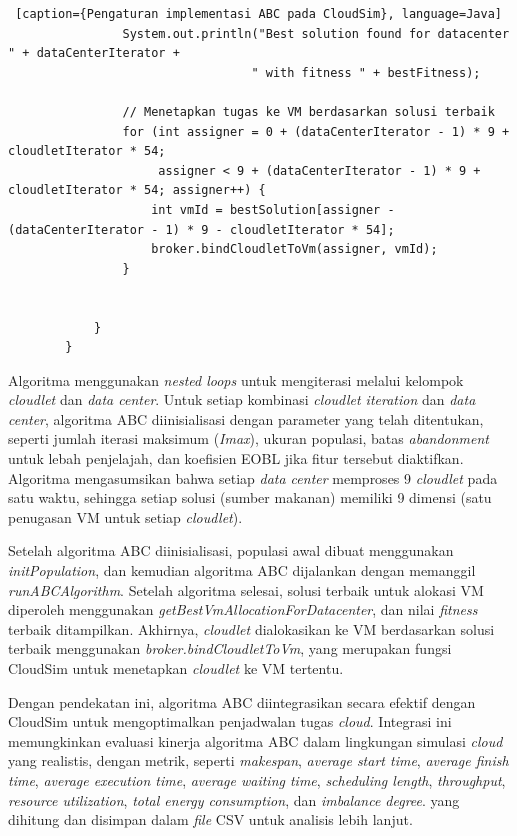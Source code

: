 \begin{lstlisting} [caption={Pengaturan implementasi ABC pada CloudSim}, language=Java]
                System.out.println("Best solution found for datacenter " + dataCenterIterator + 
                                  " with fitness " + bestFitness);

                // Menetapkan tugas ke VM berdasarkan solusi terbaik
                for (int assigner = 0 + (dataCenterIterator - 1) * 9 + cloudletIterator * 54;
                     assigner < 9 + (dataCenterIterator - 1) * 9 + cloudletIterator * 54; assigner++) {
                    int vmId = bestSolution[assigner - (dataCenterIterator - 1) * 9 - cloudletIterator * 54];
                    broker.bindCloudletToVm(assigner, vmId);
                }
                

            }
        }
\end{lstlisting}

Algoritma menggunakan \textit{nested loops} untuk mengiterasi melalui kelompok \textit{cloudlet} dan \textit{data center}. Untuk setiap kombinasi \textit{cloudlet iteration} dan \textit{data center}, algoritma ABC diinisialisasi dengan parameter yang telah ditentukan, seperti jumlah iterasi maksimum (\textit{Imax}), ukuran populasi, batas \textit{abandonment} untuk lebah penjelajah, dan koefisien EOBL jika fitur tersebut diaktifkan. Algoritma mengasumsikan bahwa setiap \textit{data center} memproses 9 \textit{cloudlet} pada satu waktu, sehingga setiap solusi (sumber makanan) memiliki 9 dimensi (satu penugasan VM untuk setiap \textit{cloudlet}).

Setelah algoritma ABC diinisialisasi, populasi awal dibuat menggunakan \textit{initPopulation}, dan kemudian algoritma ABC dijalankan dengan memanggil \textit{runABCAlgorithm}. Setelah algoritma selesai, solusi terbaik untuk alokasi VM diperoleh menggunakan \textit{getBestVmAllocationForDatacenter}, dan nilai \textit{fitness} terbaik ditampilkan. Akhirnya, \textit{cloudlet} dialokasikan ke VM berdasarkan solusi terbaik menggunakan \textit{broker.bindCloudletToVm}, yang merupakan fungsi CloudSim untuk menetapkan \textit{cloudlet} ke VM tertentu.

Dengan pendekatan ini, algoritma ABC diintegrasikan secara efektif dengan CloudSim untuk mengoptimalkan penjadwalan tugas \textit{cloud}. Integrasi ini memungkinkan evaluasi kinerja algoritma ABC dalam lingkungan simulasi \textit{cloud} yang realistis, dengan metrik, seperti \textit{makespan}, \textit{average start time}, \textit{average finish time}, \textit{average execution time}, \textit{average waiting time}, \textit{scheduling length}, \textit{throughput}, \textit{resource utilization}, \textit{total energy consumption}, dan \textit{imbalance degree}. yang dihitung dan disimpan dalam \textit{file} CSV untuk analisis lebih lanjut.


